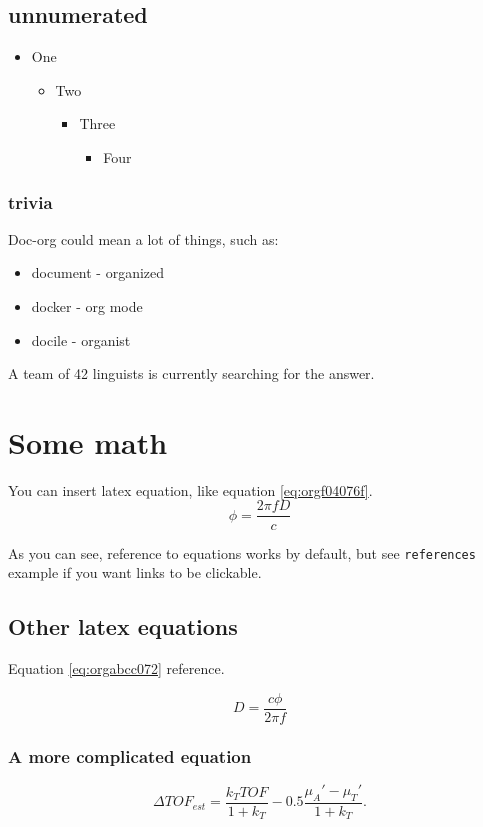 \subsection{unnumerated}
\label{sec:org23ffb39}
\begin{itemize}
\item One
\begin{itemize}
\item Two
\begin{itemize}
\item Three
\begin{itemize}
\item Four
\end{itemize}
\end{itemize}
\end{itemize}
\end{itemize}

\subsubsection{trivia}
\label{sec:org7499d3b}
Doc-org could mean a lot of things, such as:
\begin{itemize}
\item document - organized
\item docker - org mode
\item docile - organist
\end{itemize}
A team of 42 linguists is currently searching for the answer.

\section{Some math}
\label{sec:org7ace95e}
You can insert latex equation, like equation \ref{eq:orgf04076f}.
\begin{equation}
\label{eq:orgf04076f}
\phi = \frac{2\pi fD}{c}
\end{equation}

As you can see, reference to equations works by default, but see \texttt{references}
example if you want links to be clickable.

\subsection{Other latex equations}
\label{sec:org26d0b88}
Equation \ref{eq:orgabcc072} reference.

\begin{equation}
\label{eq:orgabcc072}
D = \frac{c\phi}{2\pi f}
\end{equation}

\subsubsection{A more complicated equation}
\label{sec:orgde63b93}

\begin{equation}
\Delta TOF_{est} = \frac{k_T TOF}{1+k_T } - 0.5 \frac{\mu_A' - \mu_T'}{1+k_T}.
\end{equation}



